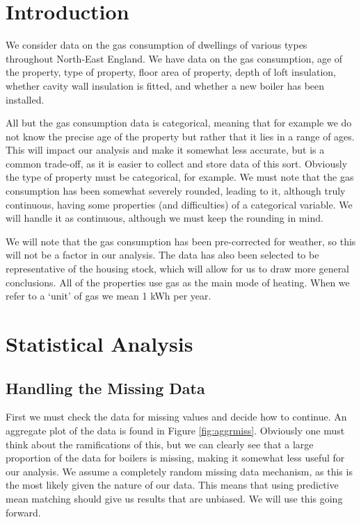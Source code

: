 \documentclass[9pt]{extarticle}
\begin{document}
\section{Introduction}

We consider data on the gas consumption of dwellings of various types throughout North-East England. We have data on the gas consumption, age of the property, type of property, floor area of property, depth of loft insulation, whether cavity wall insulation is fitted, and whether a new boiler has been installed.

All but the gas consumption data is categorical, meaning that for example we do not know the precise age of the property but rather that it lies in a range of ages. This will impact our analysis and make it somewhat less accurate, but is a common trade-off, as it is easier to collect and store data of this sort. Obviously the type of property must be categorical, for example. We must note that the gas consumption has been somewhat severely rounded, leading to it, although truly continuous, having some properties (and difficulties) of a categorical variable. We will handle it as continuous, although we must keep the rounding in mind.

We will note that the gas consumption has been pre-corrected for weather, so this will not be a factor in our analysis. The data has also been selected to be representative of the housing stock, which will allow for us to draw more general conclusions. All of the properties use gas as the main mode of heating. When we refer to a `unit' of gas we mean 1 kWh per year.

\section{Statistical Analysis}

\subsection{Handling the Missing Data}

First we must check the data for missing values and decide how to continue. An aggregate plot of the data is found in Figure \ref{fig:aggrmiss}. Obviously one must think about the ramifications of this, but we can clearly see that a large proportion of the data for boilers is missing, making it somewhat less useful for our analysis. We assume a completely random missing data mechanism, as this is the most likely given the nature of our data. This means that using predictive mean matching should give us results that are unbiased. We will use this going forward.
\end{document}
